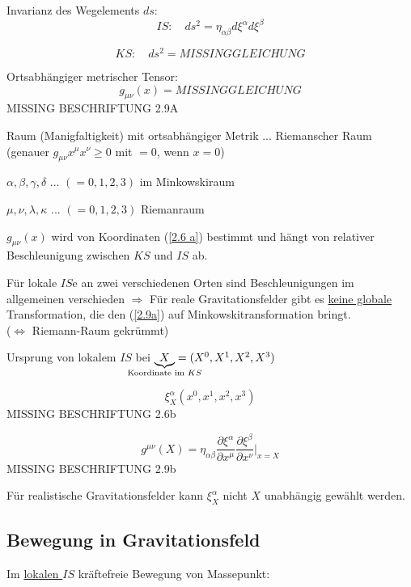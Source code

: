 \documentclass[a4paper, 11pt]{article}
\numberwithin{equation}{section}
\newcommand{\ubtext}[2]{\underbrace{#1}_{\mathclap{\text{#2}}}}
\begin{document}
Invarianz des Wegelements $ds$:
\begin{equation}
IS: \quad ds^2 = \eta_{\alpha \beta} d\xi^\alpha d \xi^\beta
\end{equation}

\begin{equation}
KS: \quad ds^2 = MISSING GLEICHUNG
\end{equation}


Ortsabhängiger metrischer Tensor:
\begin{equation}
g_{\mu \nu}(x) = MISSING GLEICHUNG
\end{equation}
MISSING BESCHRIFTUNG 2.9A


Raum (Manigfaltigkeit) mit ortsabhängiger Metrik $...$ Riemanscher Raum\\
(genauer $g_{\mu\nu}x^\mu x^\nu \geq 0 $ mit $=0$, wenn $x=0$)

$\alpha, \beta, \gamma, \delta$ $...$ $(=0,1,2,3)$ im Minkowskiraum

$\mu, \nu, \lambda, \kappa$ $...$ $(=0,1,2,3)$ Riemanraum

$g_{\mu \nu}(x)$ wird von Koordinaten (\ref{2.6 a}) bestimmt und hängt von relativer Beschleunigung zwischen $KS$ und $IS$ ab.

Für lokale $IS$e an zwei verschiedenen Orten sind Beschleunigungen im allgemeinen verschieden $\Rightarrow$ Für reale Gravitationsfelder gibt es \underline{keine globale} Transformation, die den (\ref{2.9a}) auf Minkowskitransformation bringt.\\
($\Leftrightarrow$ Riemann-Raum gekrümmt)

Ursprung von lokalem $IS$ bei $\ubtext{X}{Koordinate im $KS$} = (X^0, X^1, X^2, X^3)$

\begin{equation*}
\xi^\alpha_X (x^0, x^1, x^2, x^3)
\end{equation*}
MISSING BESCHRIFTUNG 2.6b

\begin{equation*}
g^{\mu \nu}(X) = \eta_{\alpha \beta} \dfrac{\partial\xi^\alpha}{\partial x ^\mu} \dfrac{\partial \xi^\beta}{\partial x^\nu} |_{x=X}  
\end{equation*}
MISSING BESCHRIFTUNG 2.9b

Für realistische Gravitationsfelder kann $\xi^\alpha_X$ nicht $X$ unabhängig gewählt werden.

\subsection*{Bewegung in Gravitationsfeld}
Im \underline{lokalen $IS$} kräftefreie Bewegung von Massepunkt:
\end{document}
